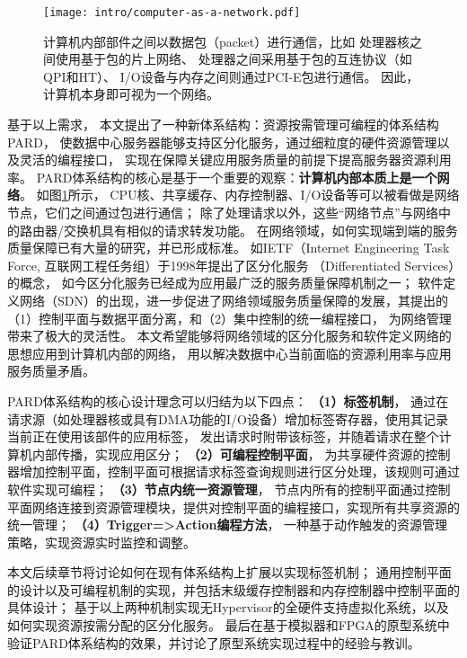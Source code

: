 \begin{figure}[H]
  \centering
  \texttt{[image: intro/computer-as-a-network.pdf]}
  \caption[计算机内部本质是一个网络]{
    计算机内部部件之间以数据包（packet）进行通信，比如
    处理器核之间使用基于包的片上网络、
    处理器之间采用基于包的互连协议（如QPI和HT）、
    I/O设备与内存之间则通过PCI-E包进行通信。
    因此，计算机本身即可视为一个网络。}
  \label{fig:computer-as-a-network}
\end{figure}

基于以上需求，
本文提出了一种新体系结构：资源按需管理可编程的体系结构PARD\cite{pard:2015}，
使数据中心服务器能够支持区分化服务，通过细粒度的硬件资源管理以及灵活的编程接口，
实现在保障关键应用服务质量的前提下提高服务器资源利用率。
PARD体系结构的核心是基于一个重要的观察：\textbf{计算机内部本质上是一个网络}。
如图\ref{fig:computer-as-a-network}所示，
CPU核、共享缓存、内存控制器、I/O设备等可以被看做是网络节点，它们之间通过包进行通信；
除了处理请求以外，这些``网络节点''与网络中的路由器/交换机具有相似的请求转发功能。
在网络领域，如何实现端到端的服务质量保障已有大量的研究，并已形成标准。
如IETF（Internet Engineering Task Force, 互联网工程任务组）于1998年提出了区分化服务
（Differentiated Services）\cite{}的概念，
如今区分化服务已经成为应用最广泛的服务质量保障机制之一；
软件定义网络（SDN）的出现，进一步促进了网络领域服务质量保障的发展，其提出的
（1）控制平面与数据平面分离，和（2）集中控制的统一编程接口，
为网络管理带来了极大的灵活性。
本文希望能够将网络领域的区分化服务和软件定义网络的思想应用到计算机内部的网络，
用以解决数据中心当前面临的资源利用率与应用服务质量矛盾。

PARD体系结构的核心设计理念可以归结为以下四点：
\textbf{（1）标签机制}，
通过在请求源（如处理器核或具有DMA功能的I/O设备）增加标签寄存器，使用其记录当前正在使用该部件的应用标签，
发出请求时附带该标签，并随着请求在整个计算机内部传播，实现应用区分；
\textbf{（2）可编程控制平面}，	%
为共享硬件资源的控制器增加控制平面，控制平面可根据请求标签查询规则进行区分处理，该规则可通过软件实现可编程；
\textbf{（3）节点内统一资源管理}，
节点内所有的控制平面通过控制平面网络连接到资源管理模块，提供对控制平面的编程接口，实现所有共享资源的统一管理；
\textbf{（4）Trigger=>Action编程方法}，
一种基于动作触发的资源管理策略，实现资源实时监控和调整。

本文后续章节将讨论如何在现有体系结构上扩展以实现标签机制；
通用控制平面的设计以及可编程机制的实现，并包括末级缓存控制器和内存控制器中控制平面的具体设计；
基于以上两种机制实现无Hypervisor的全硬件支持虚拟化系统，以及如何实现资源按需分配的区分化服务。
最后在基于模拟器和FPGA的原型系统中验证PARD体系结构的效果，并讨论了原型系统实现过程中的经验与教训。


